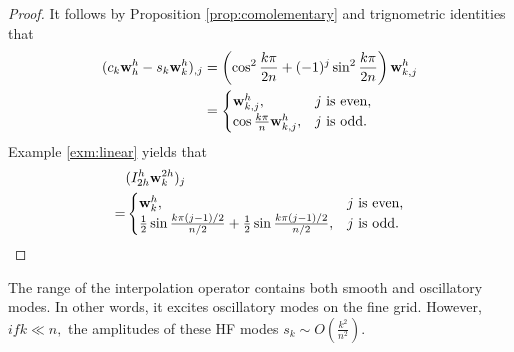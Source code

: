 \begin{proof}
  It follows by Proposition \ref{prop:comolementary} and
  trignometric identities that
  \begin{equation*}
    \begin{aligned}
      (c_k\mathbf{w}^h_h-s_k\mathbf{w}^h_k)_{,j}
      &=\left(\cos^2\frac{k\pi}{2n}+(-1)^j\sin^2\frac{k\pi}{2n}\right)
      \mathbf{w}^h_{k,j} \\
      &=
      \begin{cases}
        \mathbf{w}^h_{k,j},&j\textmd{ is even,}\\
        \cos\frac{k\pi}{n}\mathbf{w}^h_{k,j},&j\textmd{ is odd.}
      \end{cases}
    \end{aligned}
  \end{equation*}
   Example \ref{exm:linear} yields that
  \begin{equation*}
    \begin{aligned}
      &(I^h_{2h}\mathbf{w}^{2h}_k)_j\\
      =&
    \begin{cases}
      \mathbf{w}^h_k,&j\textmd{ is even,}\\
      \frac{1}{2}\sin\frac{k\pi(j-1)/2}{n/2}
      + \frac{1}{2}\sin\frac{k\pi(j-1)/2}{n/2},&j\textmd{ is odd.}
    \end{cases}
    \end{aligned}
  \end{equation*}
\end{proof}
\begin{rem}
  The range of the interpolation operator contains
  both smooth and oscillatory modes.
  In other words, it excites oscillatory modes
  on the fine grid.
  However, $if k\ll n,$
  the amplitudes of these HF modes $s_k \sim O(\frac{k^2}{n^2})$.
\end{rem}

